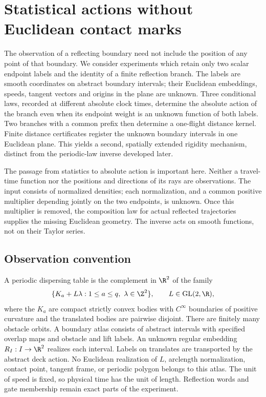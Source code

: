 \section{Statistical actions without Euclidean contact marks}
\label{sec:v77-intro}

The observation of a reflecting boundary need not include the position of
any point of that boundary.  We consider experiments which retain only two
scalar endpoint labels and the identity of a finite reflection branch.
The labels are smooth coordinates on abstract boundary intervals; their
Euclidean embeddings, speeds, tangent vectors and origins in the plane
are unknown.  Three conditional laws, recorded at different absolute
clock times, determine the absolute action of the branch even when its
endpoint weight is an unknown function of both labels.  Two branches
with a common prefix then determine a one-flight distance kernel.  Finite
distance certificates register the unknown boundary intervals in one
Euclidean plane.  This yields a second, spatially extended rigidity
mechanism, distinct from the periodic-law inverse developed later.

The passage from statistics to absolute action is important here.
Neither a travel-time function nor the positions and directions of its
rays are observations.  The input consists of normalized densities;
each normalization, and a common positive multiplier depending jointly
on the two endpoints, is unknown.  Once this multiplier is removed, the
composition law for actual reflected trajectories supplies the missing
Euclidean geometry.  The inverse acts on smooth functions, not on their
Taylor series.

\subsection{Observation convention}

A periodic dispersing table is the complement in $\R^2$ of the family
\[
 \{K_a+L\lambda:1\le a\le q,\ \lambda\in\Z^2\},
 \qquad L\in\mathrm{GL}(2,\R),
\]
where the $K_a$ are compact strictly convex bodies with $C^\infty$
boundaries of positive curvature and the translated bodies are pairwise
disjoint.  There are finitely many obstacle orbits.  A boundary atlas
consists of abstract intervals with specified overlap maps and obstacle
and lift labels.  An unknown regular embedding $R_I:I\to\R^2$ realizes
each interval.  Labels on translates are transported by the abstract
deck action.  No Euclidean realization of $L$, arclength normalization,
contact point, tangent frame, or periodic polygon belongs to this atlas.
The unit of speed is fixed, so physical time has the unit of length.
Reflection words and gate membership remain exact parts of the experiment.

